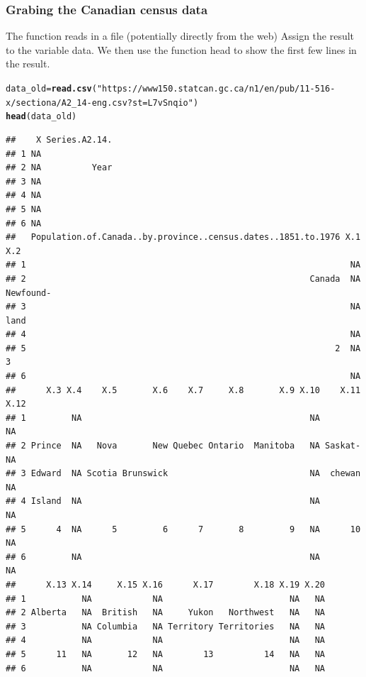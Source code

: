 \documentclass[aspectratio=169]{beamer}\usepackage[]{graphicx}\usepackage[]{xcolor}
\makeatletter
\newcommand{\hlstr}[1]{\textcolor[rgb]{0.192,0.494,0.8}{#1}}%
\newcommand{\hlstd}[1]{\textcolor[rgb]{0.345,0.345,0.345}{#1}}%
\newcommand{\hlkwb}[1]{\textcolor[rgb]{0.69,0.353,0.396}{#1}}%
\newcommand{\hlkwd}[1]{\textcolor[rgb]{0.737,0.353,0.396}{\textbf{#1}}}%
\newenvironment{kframe}{%
 \def\at@end@of@kframe{}%
 \ifinner\ifhmode%
  \def\at@end@of@kframe{\end{minipage}}%
  \begin{minipage}{\columnwidth}%
 \fi\fi%
 \def\FrameCommand##1{\hskip\@totalleftmargin \hskip-\fboxsep
 \colorbox{shadecolor}{##1}\hskip-\fboxsep
     \hskip-\linewidth \hskip-\@totalleftmargin \hskip\columnwidth}%
 \MakeFramed {\advance\hsize-\width
   \@totalleftmargin\z@ \linewidth\hsize
   \@setminipage}}%
 {\par\unskip\endMakeFramed%
 \at@end@of@kframe}
\newenvironment{knitrout}{}{} %
\makeatother
\begin{document}
\begin{frame}[fragile]\frametitle{Grabing the Canadian census data}
The function  reads in a file (potentially directly from the web)
\vfill
Assign the result to the variable data. We then use the function head to show the first few lines in the result.
\vfill
\begin{knitrout}
\color{fgcolor}\begin{kframe}
\begin{alltt}
\hlstd{data_old} \hlkwb{=} \hlkwd{read.csv}\hlstd{(}\hlstr{"https://www150.statcan.gc.ca/n1/en/pub/11-516-x/sectiona/A2_14-eng.csv?st=L7vSnqio"}\hlstd{)}
\hlkwd{head}\hlstd{(data_old)}
\end{alltt}
\begin{verbatim}
##    X Series.A2.14.
## 1 NA              
## 2 NA          Year
## 3 NA              
## 4 NA              
## 5 NA              
## 6 NA              
##   Population.of.Canada..by.province..census.dates..1851.to.1976 X.1       X.2
## 1                                                                NA          
## 2                                                        Canada  NA Newfound-
## 3                                                                NA      land
## 4                                                                NA          
## 5                                                             2  NA         3
## 6                                                                NA          
##      X.3 X.4    X.5       X.6    X.7     X.8       X.9 X.10    X.11 X.12
## 1         NA                                             NA           NA
## 2 Prince  NA   Nova       New Quebec Ontario  Manitoba   NA Saskat-   NA
## 3 Edward  NA Scotia Brunswick                            NA  chewan   NA
## 4 Island  NA                                             NA           NA
## 5      4  NA      5         6      7       8         9   NA      10   NA
## 6         NA                                             NA           NA
##      X.13 X.14     X.15 X.16      X.17        X.18 X.19 X.20
## 1           NA            NA                         NA   NA
## 2 Alberta   NA  British   NA     Yukon   Northwest   NA   NA
## 3           NA Columbia   NA Territory Territories   NA   NA
## 4           NA            NA                         NA   NA
## 5      11   NA       12   NA        13          14   NA   NA
## 6           NA            NA                         NA   NA
\end{verbatim}
\end{kframe}
\end{knitrout}
\end{frame}
\end{document}
